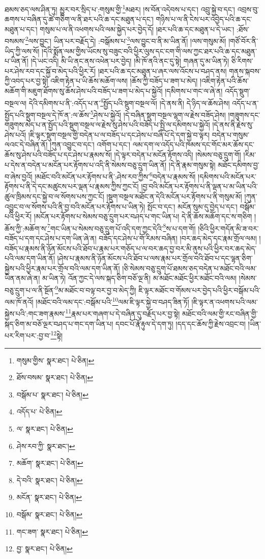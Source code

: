 ཐམས་ཅད་ལས་ཤིན་ཏུ། མྱུར་བར་སྲིད་པ་:གསུམ་གྱི་\footnote{གསུམ་གྱིས་  སྣར་ཐང་།  པེ་ཅིན། }མཐར། །ས་བོན་འདེབས་པ་དང་། འབྲུ་སྐྱེ་བ་དང་། འབྲས་བུ་ཆགས་པ་བཞིན་དུ་ཚེ་གཅིག་ལ་ནི་ཐར་པའི་ཆ་དང་མཐུན་པ་དང་། གཉིས་པ་ལ་ནི་ངེས་པར་འབྱེད་པའི་ཆ་དང་མཐུན་པ་དང་། གསུམ་པ་ལ་ནི་འཕགས་པའི་ལམ་སྐྱེད་པར་བྱེད་དོ། །ཐར་པའི་ཆ་དང་མཐུན་པ་དེ་ཡང་། :ཐོས་བསམས་\footnote{ཐོས་བསམ་  སྣར་ཐང་།  པེ་ཅིན། }ལས་བྱུང་། ཡིན་པར་བརྗོད་དེ། :བསྒོམས་པ་\footnote{བསྒོམ་པ་  སྣར་ཐང་།  པེ་ཅིན། }ལས་བྱུང་བ་ནི་མ་ཡིན་ནོ། །ལས་གསུམ་མོ། །གཙོ་བོར་ནི་ཡིད་ཀྱི་ལས་སོ། །དེའི་སྨོན་ལམ་གྱིས་ཡོངས་སུ་བཟུང་བའི་ཕྱིར་ལུས་དང་ངག་གི་ལས་ཀྱང་ཐར་པའི་ཆ་དང་མཐུན་པ་ཡིན་ནོ། །དེ་ཡང་འདི། མི་ཡི་ནང་ནས་འཕེན་པར་བྱེད། །མི་ཁོ་ནའི་ནང་དུ་སྟེ། གཞན་དུ་མ་ཡིན་ཏེ། ཅི་རིགས་པར་ཤེས་རབ་དང་སྐྱོ་བ་མེད་པའི་ཕྱིར་རོ། །ཐར་པའི་ཆ་དང་མཐུན་པ་ཞར་ལས་འོངས་པ་བཤད་ནས། གནས་སྐབས་ཀྱི་འབད་པར་བྱ་སྟེ། འཇིག་རྟེན་པ་ཡི་ཆོས་མཆོག་ལས། །ཆོས་ཀྱི་བཟོད་པ་ཟག་པ་མེད། །འཇིག་རྟེན་པའི་ཆོས་མཆོག་གི་མཇུག་ཐོགས་སུ་ཆོས་ཤེས་པའི་བཟོད་པ་ཟག་པ་མེད་པ་སྐྱེའོ། །དམིགས་པ་གང་ལ་ཞེ་ན། འདོད་སྡུག་བསྔལ་ལ། དེའི་དམིགས་པ་ནི་:འདོད་པ་ན་\footnote{འདོད་པ་  པེ་ཅིན། }སྤྱོད་པའི་སྡུག་བསྔལ་ལོ། །དེ་ནས་ནི། དེ་ཉིད་ལ་ཆོས་ཤེས། འདོད་པ་ན་སྤྱོད་པའི་སྡུག་བསྔལ་དེ་ཁོ་ན་:ལ་ཆོས་\footnote{ལ་  སྣར་ཐང་།  པེ་ཅིན། }ཤེས་པ་སྐྱེའོ། །དེ་བཞིན་སྡུག་བསྔལ་ལྷག་ལ་རྗེས་བཟོད་ཤེས། །གཟུགས་དང་གཟུགས་མེད་པ་ན་སྤྱོད་པའི་སྡུག་བསྔལ་ལ་རྗེས་སུ་ཤེས་པའི་བཟོད་པ་སྤྱི་ལ་དམིགས་པ་སྐྱེའོ། །དེ་ནས་ནི་རྗེས་སུ་ཤེས་པའོ། །ཇི་ལྟར་སྡུག་བསྔལ་གྱི་བདེན་པ་ལ་བཟོད་པ་དང་ཤེས་པ་བཞི་པོ་དེ་དག་སྐྱེ་བ་ལྟར། བདེན་པ་གསུམ་ལའང་དེ་བཞིན་ནོ། །ཀུན་འབྱུང་བ་དང་། འགོག་པ་དང་། ལམ་དག་ལ་འདོད་པའི་ཁམས་དང་གོང་མར་ཆོས་དང་ཆོས་སུ་ཤེས་པའི་བཟོད་པ་དང་ཤེས་པ་རྣམས་སོ། །དེ་ལྟར་བདེན་པ་མངོན་རྟོགས་འདི། །སེམས་བཅུ་དྲུག་གོ། །རིམ་པ་དེས་ན་བདེན་པ་མངོན་པར་རྟོགས་པ་འདི་ནི་སེམས་བཅུ་དྲུག་ཡིན་ནོ། །དེ་ནི་རྣམ་གསུམ་སྟེ། མཐོང་དམིགས་བྱ་བ་ཞེས་བྱའོ། །མཐོང་བའི་མངོན་པར་རྟོགས་པ་ནི་:ཤེས་རབ་ཀྱིས་\footnote{ཤེས་རབ་ཀྱི་  སྣར་ཐང་། }བདེན་པ་རྣམས་སོ། །དམིགས་པའི་མངོན་པར་རྟོགས་པ་ནི་དེ་དང་མཚུངས་པར་ལྡན་པ་རྣམས་ཀྱིས་ཀྱང་ངོ། །བྱ་བའི་མངོན་པར་རྟོགས་པ་ནི་ལྡན་པ་མ་ཡིན་པའི་ཚུལ་ཁྲིམས་དང་སྐྱེ་བ་ལ་སོགས་པས་ཀྱང་ངོ། །སྡུག་བསྔལ་མཐོང་ན་དེའི་མངོན་པར་རྟོགས་པ་ནི་གསུམ་མོ། །ཀུན་འབྱུང་བ་ལ་སོགས་པའི་ནི་བྱ་བའི་མངོན་པར་རྟོགས་པ་ཡིན་ཏེ། སྤོང་བ་དང་། མངོན་སུམ་དུ་བྱེད་པ་དང་། བསྒོམ་པའི་ཕྱིར་རོ། །མངོན་པར་རྟོགས་པ་སེམས་བཅུ་དྲུག་པར་བཤད་པ་གང་ཡིན་པ། དེ་ནི་ཆོས་མཆོག་དང་ས་གཅིག །ཆོས་ཀྱི་:མཆོག་ས་\footnote{མཆོག་  སྣར་ཐང་།  པེ་ཅིན། }གང་ཡིན་པ་སེམས་བཅུ་དྲུག་པོ་འདི་དག་ཀྱང་དེའི་\footnote{དེ་བའི་  སྣར་ཐང་།  པེ་ཅིན། }ས་པ་དག་གོ། །ཅིའི་ཕྱིར་གདོན་མི་ཟ་བར་བཟོད་པ་དག་དང་ཤེས་པ་དག་ཡིན་ཞེ་ན། བཟོད་དང་ཤེས་པ་གོ་རིམས་བཞིན། །བར་ཆད་མེད་དང་རྣམ་གྲོལ་ལམ། །བཟོད་པ་རྣམས་ནི་ཉོན་མོངས་པའི་ཐོབ་པ་རྣམ་པར་གཅོད་པ་ལ་བར་ཆད་བྱ་བར་མི་ནུས་པའི་ཕྱིར་བར་ཆད་མེད་པའི་ལམ་དག་ཡིན་ནོ། །ཤེས་པ་རྣམས་ནི་ཉོན་མོངས་པའི་ཐོབ་པ་ལས་རྣམ་པར་གྲོལ་བའི་ཐོབ་པ་དང་ལྷན་ཅིག་སྐྱེས་པའི་ཕྱིར་རྣམ་པར་གྲོལ་བའི་ལམ་དག་ཡིན་ནོ། །ཅི་སེམས་བཅུ་དྲུག་པོ་ཐམས་ཅད་བདེན་པ་མཐོང་བའི་ལམ་ཡིན་ནམ་ཞེ་ན། མ་ཡིན་ཏེ། འོན་ཀྱང་དེ་ལས་སྐད་ཅིག་བཅོ་ལྔ་ནི། མ་མཐོང་མཐོང་ཕྱིར་མཐོང་བའི་ལམ། །སེམས་བཅུ་དྲུག་པ་ལ་ནི་སྔོན་\footnote{མངོན་  སྣར་ཐང་།  པེ་ཅིན། }མ་མཐོང་བ་བལྟ་བར་བྱ་བ་མེད་ཀྱི། ཇི་ལྟར་མཐོང་བ་གོམས་པར་བྱེད་པའི་ཕྱིར་བསྒོམ་པའི་ལམ་ཁོ་ནའོ། །མཐོང་བའི་ལམ་དང་:བསྒོམ་པའི་\footnote{བསྒོམ་  སྣར་ཐང་།  པེ་ཅིན། }ལམ་ཇི་ལྟར་སྐྱེ་བ་བཤད་ཟིན་ཏོ། །ཇི་ལྟར་ན་འཕགས་པའི་ལམ་སྐྱེས་པའི་:གང་ཟག་རྣམས་\footnote{གང་ཟག་  སྣར་ཐང་།  པེ་ཅིན། }རྣམ་པར་གཞག་པ་དེ་བཞིན་དུ་བརྗོད་པར་བྱ་སྟེ། མཐོང་བའི་ལམ་གྱི་རང་བཞིན་གྱི་སྐད་ཅིག་མ་བཅོ་ལྔར་བཤད་པ་གང་དག་ཡིན་པ། དབང་པོ་རྣོ་རྟུལ་དེ་དག་ཏུ། །དད་དང་ཆོས་ཀྱི་རྗེས་འབྲང་བ། །ཡིན་པར་རིག་པར་:བྱ་བ་\footnote{བྱ་  སྣར་ཐང་།  པེ་ཅིན། }སྟེ། 
